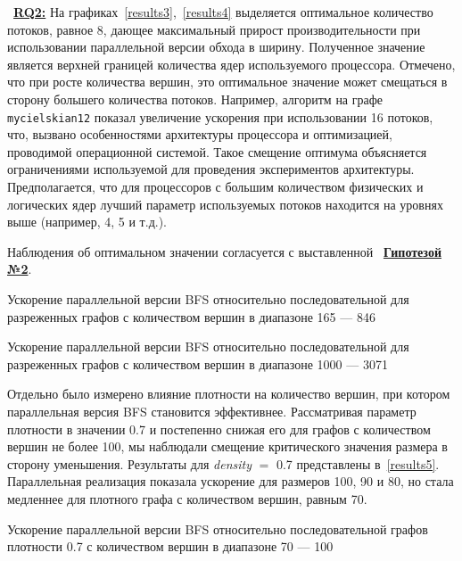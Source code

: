 ~\hyperref[rq2]{\textbf{RQ2:}}
На графиках~\ref{results3},~\ref{results4} выделяется оптимальное количество потоков, равное 8, дающее максимальный прирост производительности при использовании параллельной версии обхода в ширину. Полученное значение является верхней границей количества ядер используемого процессора. Отмечено, что при росте количества вершин, это оптимальное значение может смещаться в сторону большего количества потоков. Например, алгоритм на графе \texttt{mycielskian12} показал увеличение ускорения при использовании 16 потоков, что, вызвано особенностями архитектуры процессора и оптимизацией, проводимой операционной системой. Такое смещение оптимума объясняется ограничениями используемой для проведения экспериментов архитектуры. Предполагается, что для процессоров с большим количеством физических и логических ядер лучший параметр используемых потоков находится на уровнях выше (например, 4, 5 и т.д.). 

Наблюдения об оптимальном значении согласуется с выставленной ~\hyperref[t2]{\textbf{Гипотезой №2}}.
\newline

\begin{table}
  \centering

\caption{Ускорение параллельной версии BFS относительно последовательной для разреженных графов с количеством вершин в диапазоне 165 --- 846}
\label{results3}
\end{table}

\begin{table}
  \centering

\caption{Ускорение параллельной версии BFS относительно последовательной для разреженных графов с количеством вершин в диапазоне 1000 --- 3071}
\label{results4}
\end{table}

Отдельно было измерено влияние плотности на количество вершин, при котором параллельная версия BFS становится эффективнее. Рассматривая параметр плотности в значении 0.7 и постепенно снижая его для графов с количеством вершин не более 100, мы наблюдали смещение критического значения размера в сторону уменьшения. Результаты для \textit{density} $=$ 0.7 представлены в~\ref{results5}. Параллельная реализация показала ускорение для размеров 100, 90 и 80, но стала медленнее для плотного графа с количеством вершин, равным 70.

\begin{table}
  \centering

\caption{Ускорение параллельной версии BFS относительно последовательной графов плотности 0.7 с количеством вершин в диапазоне 70 --- 100}
\label{results5}
\end{table}


